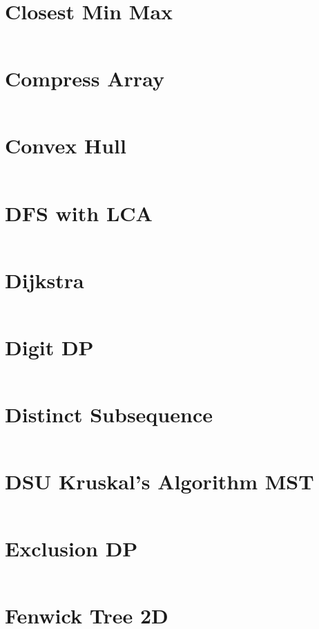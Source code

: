 \documentclass[10pt,a4paper,landscape]{article}
\begin{document}
\begin{multicols*}{3}
		\section{Closest Min Max}
		\inputminted{cpp}{codes/CLOSEST_MIN_MAX.cpp}
		
		\section{Compress Array}
		\inputminted{cpp}{codes/COMPRESS_ARRAY.cpp}
		
		\section{Convex Hull}
		\inputminted{cpp}{codes/CONVEX_HULL.cpp}
		
		\section{DFS with LCA}
		\inputminted{cpp}{codes/DFS_with_LCA.cpp}
		
		\section{Dijkstra}
		\inputminted{cpp}{codes/DIJKSTRA.cpp}
		
		\section{Digit DP}
		\inputminted{cpp}{codes/DIGIT_DP.cpp}
		
		\section{Distinct Subsequence}
		\inputminted{cpp}{codes/DISTINCT_SUBSEQUENCE.cpp}
		
		\section{DSU Kruskal's Algorithm MST}
		\inputminted{cpp}{codes/DSU_KRUSKALS_ALGORITHM_MST.cpp}
		
		\section{Exclusion DP}
		\inputminted{cpp}{codes/exclutionDP.cpp}
		
		\section{Fenwick Tree 2D}
		\inputminted{cpp}{codes/FENWICK_TREE_2D.cpp}
		

\end{multicols*}
\end{document}
